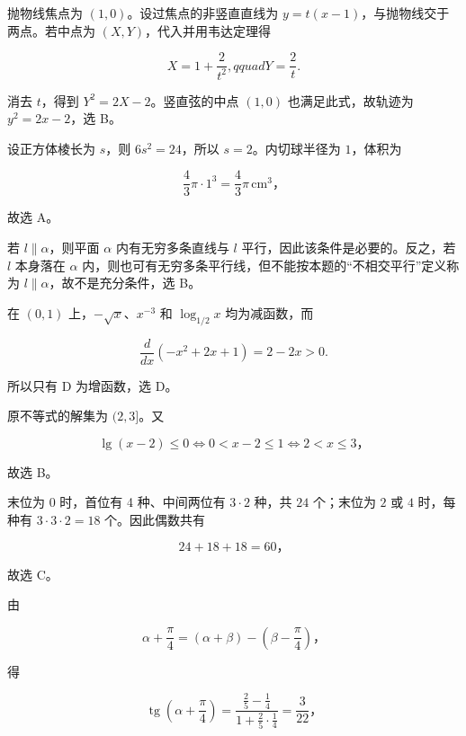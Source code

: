 \begin{answer}
抛物线焦点为 $(1,0)$。设过焦点的非竖直直线为 $y=t(x-1)$，与抛物线交于两点。若中点为 $(X,Y)$，代入并用韦达定理得

\nopagebreak[4]
\[
X=1+\frac2{t^2},qquad Y=\frac2t.
\]

消去 $t$，得到 $Y^2=2X-2$。竖直弦的中点 $(1,0)$ 也满足此式，故轨迹为 $y^2=2x-2$，选 B。


设正方体棱长为 $s$，则 $6s^2=24$，所以 $s=2$。内切球半径为 $1$，体积为

\nopagebreak[4]
\[
\frac43\pi\cdot1^3=\frac43\pi\,\mathrm{cm}^3\text{，}
\]

故选 A。


若 $l\parallel\alpha$，则平面 $\alpha$ 内有无穷多条直线与 $l$ 平行，因此该条件是必要的。反之，若 $l$ 本身落在 $\alpha$ 内，则也可有无穷多条平行线，但不能按本题的“不相交平行”定义称为 $l\parallel\alpha$，故不是充分条件，选 B。


在 $(0,1)$ 上，$-\sqrt x$、$x^{-3}$ 和 $\log_{1/2}x$ 均为减函数，而

\nopagebreak[4]
\[
\frac{d}{dx}(-x^2+2x+1)=2-2x>0.
\]

所以只有 D 为增函数，选 D。


原不等式的解集为 $(2,3]$。又

\nopagebreak[4]
\[
\lg(x-2)\leq0
\Longleftrightarrow 0<x-2\leq1
\Longleftrightarrow 2<x\leq3\text{，}
\]

故选 B。


末位为 $0$ 时，首位有 4 种、中间两位有 $3\cdot2$ 种，共 $24$ 个；末位为 $2$ 或 $4$ 时，每种有 $3\cdot3\cdot2=18$ 个。因此偶数共有

\nopagebreak[4]
\[
24+18+18=60\text{，}
\]

故选 C。


由

\nopagebreak[4]
\[
\alpha+\frac\pi4=(\alpha+\beta)-\left(\beta-\frac\pi4\right)\text{，}
\]

得

\nopagebreak[4]
\[
\operatorname{tg}\left(\alpha+\frac\pi4\right)
=\frac{\frac25-\frac14}{1+\frac25\cdot\frac14}
=\frac3{22}\text{，}
\]


\end{answer}
